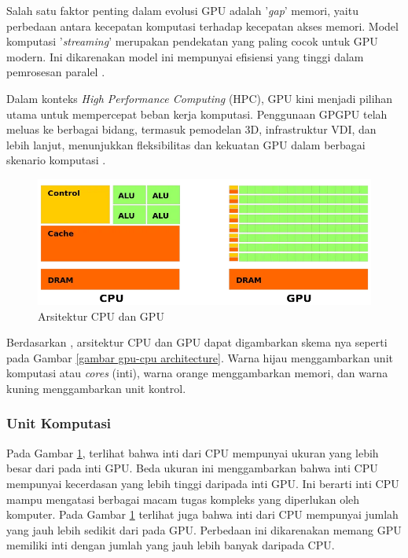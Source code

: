 
Salah satu faktor penting dalam evolusi GPU adalah '\emph{gap}' memori, yaitu
perbedaan antara kecepatan komputasi terhadap kecepatan akses memori. Model
komputasi '\emph{streaming}' merupakan pendekatan yang paling cocok untuk GPU
modern. Ini dikarenakan model ini mempunyai efisiensi yang tinggi dalam
pemrosesan paralel \citep{pharrGPUGemsProgramming2005}.


Dalam konteks \emph{High Performance Computing} (HPC), GPU kini menjadi pilihan utama untuk
mempercepat beban kerja komputasi. Penggunaan GPGPU telah meluas ke berbagai
bidang, termasuk pemodelan 3D, infrastruktur VDI, dan lebih lanjut, menunjukkan
fleksibilitas dan kekuatan GPU dalam berbagai skenario komputasi
\citep{hagoortExploringGPUArchitecture2023}.

\begin{figure}[H]
	\centering
	\includegraphics[width=14cm]{images/cpu-gpu-architecture.png}
	\caption{Arsitektur CPU dan GPU}
	\label{gambar gpu-cpu architecture}
\end{figure}

Berdasarkan \cite{learningUnderstandingArchitectureGPU2023}, arsitektur CPU dan
GPU dapat digambarkan skema nya seperti pada Gambar \ref{gambar gpu-cpu
	architecture}. Warna hijau menggambarkan unit komputasi atau \emph{cores}
(inti), warna orange menggambarkan memori, dan warna kuning menggambarkan unit
kontrol.

\subsubsection{Unit Komputasi}
\label{unit komputasi}

Pada Gambar \ref{gambar gpu-cpu architecture}, terlihat bahwa inti dari CPU
mempunyai ukuran yang lebih besar dari pada inti GPU. Beda ukuran ini
menggambarkan bahwa inti CPU mempunyai kecerdasan yang lebih tinggi daripada
inti GPU. Ini berarti inti CPU mampu mengatasi berbagai macam tugas kompleks
yang diperlukan oleh komputer. Pada Gambar \ref{gambar gpu-cpu architecture}
terlihat juga bahwa inti dari CPU mempunyai jumlah yang jauh lebih sedikit dari
pada GPU. Perbedaan ini dikarenakan memang GPU memiliki inti dengan jumlah yang
jauh lebih banyak daripada CPU.

